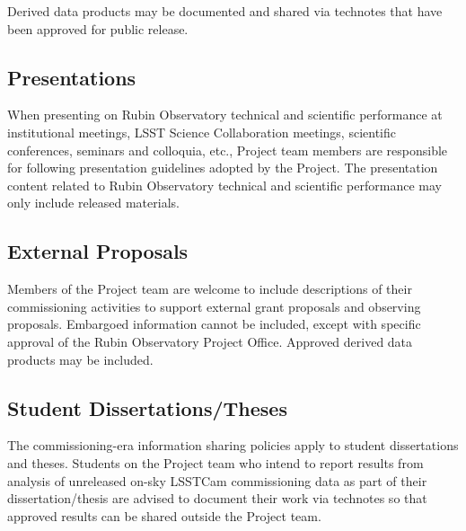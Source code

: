 \documentclass[SE,authoryear,toc,lsstdraft]{lsstdoc}
\begin{document}
Derived data products may be documented and shared via technotes that have been approved for public release.


\subsection{Presentations}

When presenting on Rubin Observatory technical and scientific performance at institutional meetings, LSST Science Collaboration meetings, scientific conferences, seminars and colloquia, etc., Project team members are responsible for following presentation guidelines adopted by the Project.
The presentation content related to Rubin Observatory technical and scientific performance may only include released materials.

\subsection{External Proposals}

Members of the Project team are welcome to include descriptions of their commissioning activities to support external grant proposals and observing proposals.
Embargoed information cannot be included, except with specific approval of the Rubin Observatory Project Office.
Approved derived data products may be included.

\subsection{Student Dissertations/Theses}

The commissioning-era information sharing policies apply to student dissertations and theses.
Students on the Project team who intend to report results from analysis of unreleased on-sky LSSTCam commissioning data as part of their dissertation/thesis are advised to document their work via technotes so that approved results can be shared outside the Project team.
\end{document}
